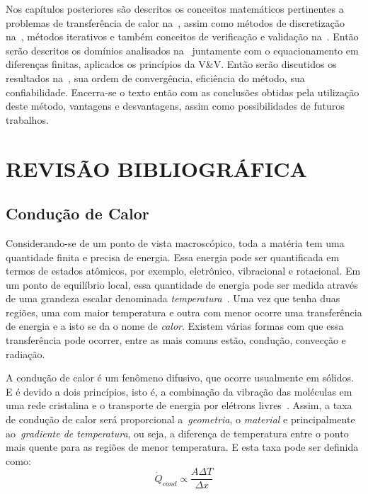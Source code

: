 \documentclass[
	12pt,				  %
	openright,		%
	twoside,			%
	a4paper,			%
	chapter=TITLE,		    %
	english,			%
	brazil				%
	]{abntex2}
\begin{document}
Nos capítulos posteriores são descritos os conceitos matemáticos pertinentes a
problemas de transferência de calor na~, assim como
métodos de discretização na~, métodos iterativos e também
conceitos de verificação e validação na~. Então serão descritos
os domínios analisados na~ juntamente com o equacionamento
em diferenças finitas, aplicados os princípios da V\&V. Então serão discutidos
os resultados na~, sua ordem de convergência, eficiência do
método, sua confiabilidade. Encerra-se o texto então com as conclusões obtidas
pela utilização deste método, vantagens e desvantagens, assim como
possibilidades de futuros trabalhos.
\chapter{REVISÃO BIBLIOGRÁFICA}
\section{Condução de Calor}\label{chap:condcalor}

Considerando-se de um ponto de vista macroscópico, toda a matéria tem uma
quantidade finita e precisa de energia. Essa energia pode ser quantificada
em termos de estados atômicos, por exemplo, eletrônico, vibracional e
rotacional. Em um ponto de equilíbrio local, essa quantidade de energia pode
ser medida através de uma grandeza escalar denominada
\emph{temperatura}~\cite{ozisik2012}. Uma vez que tenha duas regiões, uma com
maior temperatura e outra com menor ocorre uma transferência de energia e a
isto se da o nome de \emph{calor}. Existem várias formas com que essa
transferência pode ocorrer, entre as mais comuns estão, condução, convecção e
radiação. 

A condução de calor é um fenômeno difusivo, que ocorre usualmente em sólidos. E
é devido a dois princípios, isto é, a combinação da vibração das moléculas em
uma rede cristalina e o transporte de energia por elétrons
livres~\cite{cengel2015}. Assim, a taxa de condução de calor será proporcional
a~\textit{geometria}, o \textit{material} e principalmente ao~\textit{gradiente
de temperatura}, ou seja, a diferença de temperatura entre o ponto mais quente
para as regiões de menor temperatura. E esta taxa pode ser definida como:
\begin{equation}
    \dot{Q}_{cond} \propto \frac{A \Delta T}{\Delta x}
\end{equation}
\end{document}
